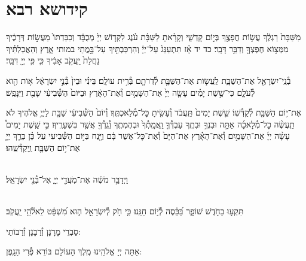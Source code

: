\documentclass[twoside, openany, parskip=half, 11pt]{book}
\begin{document}
%


%
%
%
\chapter[קידושא רבא]{ קידושא רבא }

מִשַּׁבָּת֙ רַגְלֶ֔ךָ עֲשׂ֥וֹת חֲפָצֶ֖ךָ בְּי֣וֹם קׇדְשִׁ֑י וְקָרָ֨אתָ לַשַּׁבָּ֜ת עֹ֗נֶג לִקְד֤וֹשׁ יְיָ֙ מְכֻבָּ֔ד וְכִבַּדְתּוֹ֙ מֵעֲשׂ֣וֹת דְּרָכֶ֔יךָ מִמְּצ֥וֹא חֶפְצְךָ֖ וְדַבֵּ֥ר דָּבָֽר׃ כד יד אָ֗ז תִּתְעַנַּג֙ עַל־יְיָ֔ וְהִרְכַּבְתִּ֖יךָ עַל־בָּ֣מֳתֵי במותי אָ֑רֶץ וְהַאֲכַלְתִּ֗יךָ נַחֲלַת֙ יַֽעֲקֹ֣ב אָבִ֔יךָ כִּ֛י פִּ֥י יְיָ֖ דִּבֵּֽר׃

בְ֯נֵֽי־יִשְׂרָאֵ֖ל אֶת־הַשַּׁבָּ֑ת לַֽעֲשׂ֧וֹת אֶת־הַשַּׁבָּ֛ת לְ֯דֹֽרֹתָ֖ם בְּ֯רִ֥ית עוֹלָֽם׃ בֵּינִ֗י וּבֵין֙ בְּ֯נֵ֣י יִשְׂרָאֵ֔ל א֥וֹת הִ֖וא לְ֯עֹלָ֑ם כִּי־שֵׁ֣שֶׁת יָמִ֗ים עָשָׂ֤ה יְיָ֙ אֶת־הַשָּׁמַ֣יִם וְ֯אֶת־הָאָ֔רֶץ וּבַיּוֹם֙ הַשְּׁ֯בִיעִ֔י שָׁבַ֖ת וַיִּנָּפַֽשׁ׃


אֶת־י֥וֹם הַשַּׁבָּ֖ת לְ֯קַדְּ֯שֽׁוֹ׃ שֵׁ֤שֶׁת יָמִים֙ תַּֽעֲבֹ֔ד וְ֯עָשִׂ֖יתָ כׇּל־מְ֯לַאכְתֶּֽךָ׃ וְ֯יוֹם֙ הַשְּׁ֯בִיעִ֔י שַׁבָּ֖ת לַיֽיֳ֣ אֱלֹהֶיךָ לֹא תַֽעֲשֶׂ֨ה כׇל־מְ֯לָאכָ֜ה אַתָּ֣ה וּבִנְךָ֣ וּבִתֶֽךָ עַבְדְּ֯ךָ֤ וַֽאֲמָֽתְ֯ךָ֙ וּבְהֶמְתֶֽךָ וְ֯גֵֽרְ֯ךָ֖ אֲשֶׁ֥ר בִּשְׁעָרֶֽיךָ׃ כִּ֣י שֵֽׁשֶׁת יָמִים֩ עָשָׂ֨ה יְיָ֜ אֶת־הַשָּׁמַ֣יִם וְ֯אֶת־הָאָ֗רֶץ אֶת־הַיָּם֙ וְ֯אֶת־כׇּל־אֲשֶׁר בָּ֔ם וַיָּ֖נַח בַּיּ֣וֹם הַשְּׁ֯בִיעִי עַל כֵּ֗ן בֵּרַ֧ךְ יְיָ֛ אֶת־י֥וֹם הַשַּׁבָּ֖ת וַֽיְקַדְּ֯שֵֽׁהוּ׃

\begin{sometimes}

\\
וַיְדַבֵּ֣ר מֹשֶׁ֔ה אֶת־מֹֽעֲדֵ֖י יְיָ֑ אֶל־בְּ֯נֵ֖י יִשְׂרָאֵֽל׃

\sepline

\\
תִּקְע֣וּ בַחֹ֣דֶשׁ שׁוֹפָ֑ר בַּ֝כֵּ֗סֶה לְ֯י֣וֹם חַגֵּֽנוּ׃ כִּ֤י חֹ֣ק לְ֯יִשְׂרָאֵ֣ל ה֑וּא מִ֝שְׁפָּ֗ט לֵאלֹ֘הֵ֥י יַֽעֲקֹֽב׃

\end{sometimes}

\vspace{-.5\baselineskip}

\begin{scriptsize}
סַבְרֵי מָרָנָן וְ֯רַבָּנָן וְ֯רַבּוֹתַי: \\
\end{scriptsize}
אַתָּה יְיָ אֱלֹהֵֽינוּ מֶֽלֶךְ הָעוֹלָם בּוֹרֵא פְּ֯רִי הַגָֽפֶן:
\end{document}
